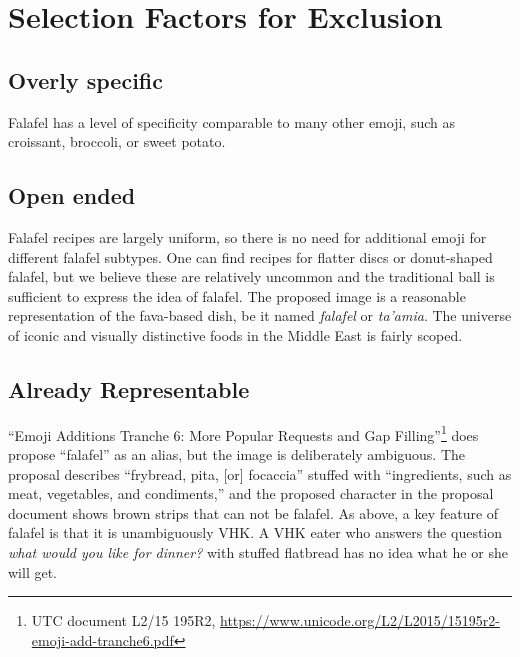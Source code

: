 \documentclass[a4paper,10pt]{article}
\begin{document}
\section{Selection Factors for Exclusion}

\subsection{Overly specific}

{\sc Falafel} has a level of specificity comparable to many other emoji, such as
{\sc croissant}, {\sc broccoli}, or {\sc sweet potato}.

\subsection{Open ended}

Falafel recipes are largely uniform, so there is no need for additional emoji for
different falafel subtypes. One can find recipes for flatter discs or donut-shaped
falafel, but we believe these are relatively uncommon and the traditional ball is
sufficient to express the idea of falafel. The proposed image is a reasonable
representation of the fava-based dish, be it named {\em falafel} or {\em ta'amia}.
The universe of iconic and visually distinctive foods in the Middle East is fairly scoped.

\subsection{Already Representable}

``Emoji Additions Tranche 6: More Popular Requests
and Gap Filling''\footnote{UTC document L2/15 195R2,
\url{https://www.unicode.org/L2/L2015/15195r2-emoji-add-tranche6.pdf}} does propose
``falafel'' as an alias, but the image is deliberately ambiguous. The proposal describes
``frybread, pita, [or] focaccia'' stuffed with ``ingredients, such as meat, vegetables,
and condiments,'' and the proposed character in the proposal document shows brown strips that
can not be falafel.  As above, a key feature of falafel is that it is unambiguously VHK.
A VHK eater who answers the question {\em what would you like for dinner?} with {\sc
stuffed flatbread} has no idea what he or she will get.
\end{document}
